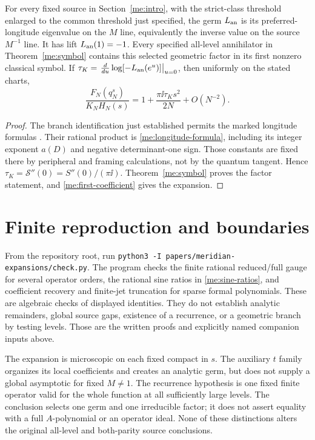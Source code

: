 \begin{corollary}\label{me:geometric-factor}
For every fixed source in Section~\ref{me:intro}, with the strict-class
threshold enlarged to the common threshold just specified, the germ
$L_{\rm an}$ is its preferred-longitude eigenvalue on the $M$
line, equivalently the inverse value on the source $M^{-1}$ line.
It has lift $L_{\rm an}(1)=-1$. Every specified all-level
annihilator in Theorem~\ref{me:symbol} contains this selected
geometric factor in its first nonzero classical symbol. If
$\tau_K=\left.\frac{d}{du}\log[-L_{\rm an}(e^u)]\right|_{u=0}$,
then uniformly on the stated charts,
\[
 \frac{F_N(q_N^s)}{K_NH_N(s)}
       =1+\frac{\pi\ii\tau_K s^2}{2N}+O(N^{-2}).
\]
\end{corollary}
\begin{proof}
The branch identification just established permits the marked
longitude formulas \cite[Theorems 1.2--1.3]{Longitudes}. Their
rational product is \eqref{me:longitude-formula}, including its
integer exponent $a(D)$ and negative determinant-one sign. Those
constants are fixed there by peripheral and framing calculations,
not by the quantum tangent. Hence $\tau_K=\mathcal S''(0)
=S''(0)/(\pi\ii)$. Theorem~\ref{me:symbol} proves the factor
statement, and \eqref{me:first-coefficient} gives the expansion.
\end{proof}

\section{Finite reproduction and boundaries}\label{me:checks}
From the repository root, run
\texttt{python3 -I papers/meridian-expansions/check.py}.
The program checks the finite rational
reduced/full gauge for several operator orders, the rational sine
ratios in \eqref{me:sine-ratios}, and coefficient recovery and
finite-jet truncation for sparse formal polynomials. These are
algebraic checks of displayed identities. They do not establish
analytic remainders, global source gaps, existence of a recurrence,
or a geometric branch by testing levels. Those are the written
proofs and explicitly named companion inputs above.

The expansion is microscopic on each fixed compact in $s$.
The auxiliary $t$ family organizes its local coefficients and
creates an analytic germ, but does not supply a global asymptotic
for fixed $M\ne1$. The recurrence hypothesis is one fixed finite
operator valid for the whole function at all sufficiently large
levels. The conclusion selects one germ and one irreducible factor;
it does not assert equality with a full $A$-polynomial or an
operator ideal. None of these distinctions alters the original
all-level and both-parity source conclusions.
